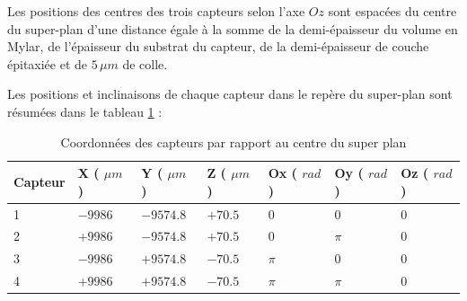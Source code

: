 % 
%     
% 
     
  \medskip
  
  Les positions des centres des trois capteurs selon l'axe $Oz$ sont espac\'ees du centre du super-plan d'une distance \'egale \`a la somme de la demi-\'epaisseur du volume en Mylar, de l'\'epaisseur du substrat du capteur, de la demi-\'epaisseur de couche \'epitaxi\'ee et de $5 \, \mu m$ de colle.
  
  \medskip
  
  Les positions et inclinaisons de chaque capteur dans le rep\`ere du super-plan sont r\'esum\'ees dans le tableau \ref{tab:coordCapteurSALAT} :
   
   \begin{table}[h]
   \begin{center}
   \begin{tabular}{|l|l|l|l|l|l|l|} \hline
   Capteur & X ( $\mu m$ ) & Y ( $\mu m$ ) & Z ( $\mu m$ ) & Ox ( $rad$ ) & Oy ( $rad$ ) & Oz ( $rad$ ) \\ \hline
   1 & $-9986$ & $-9574.8$ & $+70.5$ & 0 & 0 & 0 \\ \hline
   2 & $+9986$ & $-9574.8$ & $+70.5$ & 0 & $\pi$ & 0 \\ \hline
   3 & $-9986$ & $+9574.8$ & $-70.5$ & $\pi$ & 0 & 0 \\ \hline
   4 & $+9986$ & $+9574.8$ & $-70.5$ & $\pi$ & $\pi$ & 0 \\ \hline
   \end{tabular}
   \caption{Coordonn\'ees des capteurs par rapport au centre du super plan}
   \label{tab:coordCapteurSALAT}
   \end{center}
   \end{table}
   
